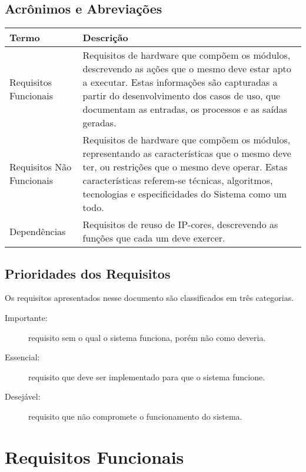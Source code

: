 \documentclass{article}
\begin{document}
  \subsection{Acrônimos e Abreviações}
  
  \FloatBarrier
  \begin{table}[H]
    \begin{center}
      \begin{tabular}[pos]{|m{5cm} | m{9cm}|} 
        \hline
        \cellcolor[gray]{0.9}\textbf{Termo} & \cellcolor[gray]{0.9}\textbf{Descrição} \\ \hline
        Requisitos Funcionais & Requisitos de hardware que compõem os módulos, descrevendo as ações que o mesmo deve estar apto a executar. Estas informações são capturadas a partir do desenvolvimento dos casos de uso, que documentam as entradas, os processos e as saídas geradas.  \\ \hline
        Requisitos Não Funcionais & Requisitos de hardware que compõem os módulos, representando as características que o mesmo deve ter, ou restrições que o mesmo deve operar. Estas características referem-se técnicas, algoritmos, tecnologias e especificidades do Sistema como um todo.  \\ \hline
        Dependências & Requisitos de reuso de IP-cores, descrevendo as funções que cada um deve exercer. \\ \hline
      \end{tabular}
    \end{center}
  \end{table}  

  \subsection{Prioridades dos Requisitos}
    Os requisitos apresentados nesse documento são classificados em três categorias.

    \begin{description}
     \item[Importante:] requisito sem o qual o sistema funciona, porém não como deveria.
     \item[Essencial:] requisito que deve ser implementado para que o sistema funcione.
     \item[Desejável:] requisito que não compromete o funcionamento do sistema.
    \end{description}

\section{Requisitos Funcionais}
\end{document}
